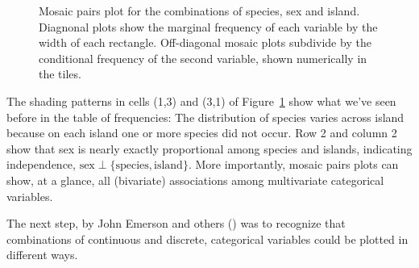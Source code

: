 \documentclass[
  letterpaper,
  10pt,
  krantz2]{krantz}
\begin{document}
\begin{figure}[H]


\caption{\label{fig-peng-mosaic}Mosaic pairs plot for the combinations
of species, sex and island. Diagnonal plots show the marginal frequency
of each variable by the width of each rectangle. Off-diagonal mosaic
plots subdivide by the conditional frequency of the second variable,
shown numerically in the tiles.}

\end{figure}%

The shading patterns in cells (1,3) and (3,1) of
Figure~\ref{fig-peng-mosaic} show what we've seen before in the table of
frequencies: The distribution of species varies across island because on
each island one or more species did not occur. Row 2 and column 2 show
that sex is nearly exactly proportional among species and islands,
indicating independence,
\(\text{sex} \perp \{\text{species}, \text{island}\}\). More
importantly, mosaic pairs plots can show, at a glance, all (bivariate)
associations among multivariate categorical variables.

The next step, by John Emerson and others
() was to
recognize that combinations of continuous and discrete, categorical
variables could be plotted in different ways.
\end{document}
